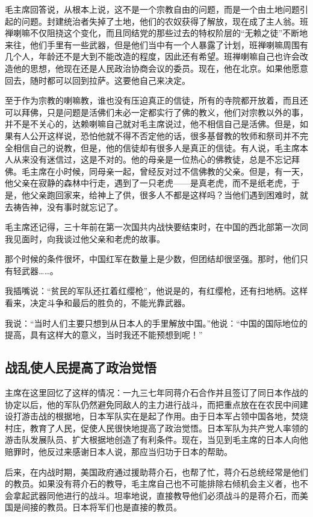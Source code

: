 毛主席回答说，从根本上说，这不是一个宗教自由的问题，而是一个由土地问题引起的问题。封建统治者失掉了土地，他们的农奴获得了解放，现在成了主人翁。班禅喇嘛不仅阻挠这个变化，而且同结党的那些过去的特权阶层的“无赖之徒”不断地来往，他们手里有一些武器，但是他们当中有一个人暴露了计划，班禅喇嘛周围有几个人，年龄还不是大到不能改造的程度，因此还有希望。班禅喇嘛自己也许会改造他的思想，他现在还是人民政治协商会议的委员。现在，他在北京。如果他愿意回去，随时都可以回到拉萨。这要他自己来决定。

至于作为宗教的喇嘛教，谁也没有压迫真正的信徒，所有的寺院都开放着，而且还可以拜佛，只是问题是活佛们未必一定都实行了佛的教义，他们对宗教以外的事，并不是不关心的，达赖喇嘛自己就对毛主席说过，他不相信自己是活佛。但是，如果有人公开这样说，恐怕他就不得不否定他的话，很多基督教的牧师和祭司并不完全相信自己的说教，但是，他的信徒却有很多人是真正的信徒。有人说，毛主席本人从来没有迷信过，这是不对的。他的母亲是一位热心的佛教徒，总是不忘记拜佛。毛主席在小时候，同母亲一起，曾经反对过不信佛教的父亲。但是，有一天，他父亲在寂静的森林中行走，遇到了一只老虎——是真老虎，而不是纸老虎，于是，他父亲跑回家来，给神上了供，很多人不都是这样吗？当他们遇到困难时，就去祷告神，没有事时就忘记了。

毛主席还记得，三十年前在第一次国共内战快要结束时，在中国的西北部第一次同我见面时，向我谈过他父亲和老虎的故事。

那个时候的条件很坏，中国红军在数量上是少数，但团结却很坚强。那时，他们只有轻武器……。

我插嘴说：“贫民的军队还扛着红缨枪”，他说是的，有红缨枪，还有扫地柄。这样看来，决定斗争和最后的胜负的，不能光靠武器。

我说：“当时人们主要只想到从日本人的手里解放中国。”他说：“中国的国际地位的提高，具有这样大的意义，当时我还不能预想到呢！”

\subsection{战乱使人民提高了政治觉悟}

主席在这里回忆了这样的情况：一九三七年同蒋介石合作并且签订了同日本作战的协定以后，他的军队仍然避免同敌人的主力进行战斗，而把重点放在在农民中间建设打游击战的根据地，日本军队实在是起了作用。由于日本军占领中国各地，焚烧村庄，教育了人民，促使人民很快地提高了政治觉悟。日本军队为共产党人率领的游击队发展队员、扩大根据地创造了有利条件。现在，当见到毛主席的日本人向他赔罪时，他反过来感谢日本人说，那应当归功于日本的帮助。

后来，在内战时期，美国政府通过援助蒋介石，也帮了忙，蒋介石总统经常是他们的教员。如果没有蒋介石的教导，毛主席自己也不可能排除右倾机会主义者，也不会拿起武器同他进行的战斗。坦率地说，直接教导他们必须战斗的是蒋介石，而美国是间接的教员。日本将军们也是直接的教员。

